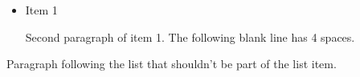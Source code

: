 
\def\mytitle{MMD List Parsing Test}


\begin{itemize}
\item Item 1

Second paragraph of item 1.
The following blank line has 4 spaces.

\end{itemize}

Paragraph following the list that shouldn't be part of the list item.




